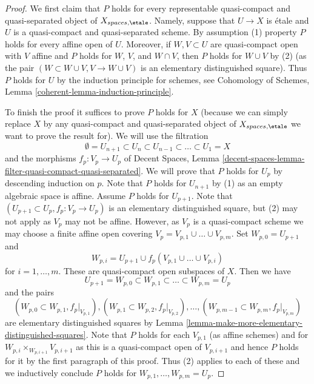 \begin{proof}
We first claim that $P$ holds for every representable
quasi-compact and quasi-separated object of $X_{spaces, \etale}$.
Namely, suppose that $U \to X$ is \'etale and $U$ is a
quasi-compact and quasi-separated scheme. By assumption (1)
property $P$ holds for every affine open of $U$. Moreover, if
$W, V \subset U$ are quasi-compact open with $V$ affine and $P$ holds for 
$W$, $V$, and $W \cap V$, then $P$ holds for $W \cup V$ by (2)
(as the pair $(W \subset W \cup V, V \to W \cup V)$ is an elementary
distinguished square). Thus $P$ holds for $U$ by the induction
principle for schemes, see
Cohomology of Schemes, Lemma \ref{coherent-lemma-induction-principle}.

\medskip\noindent
To finish the proof it suffices to prove $P$ holds for $X$
(because we can simply replace $X$ by any quasi-compact and quasi-separated
object of $X_{spaces, \etale}$ we want to prove the result for).
We will use the filtration
$$
\emptyset = U_{n + 1} \subset
U_n \subset U_{n - 1} \subset \ldots \subset U_1 = X
$$
and the morphisms $f_p : V_p \to U_p$ of
Decent Spaces, Lemma
\ref{decent-spaces-lemma-filter-quasi-compact-quasi-separated}.
We will prove that $P$ holds for $U_p$ by descending induction on $p$.
Note that $P$ holds for $U_{n + 1}$ by (1)
as an empty algebraic space is affine. Assume $P$ holds for $U_{p + 1}$.
Note that $(U_{p + 1} \subset U_p, f_p : V_p \to U_p)$ is an elementary
distinguished square, but (2) may not apply as $V_p$ may not be affine.
However, as $V_p$ is a quasi-compact scheme we may choose a finite affine open
covering $V_p = V_{p, 1} \cup \ldots \cup V_{p, m}$.
Set $W_{p, 0} = U_{p + 1}$ and
$$
W_{p, i} = U_{p + 1} \cup f_p(V_{p, 1} \cup \ldots \cup V_{p, i})
$$
for $i = 1, \ldots, m$. These are quasi-compact open subspaces of $X$.
Then we have
$$
U_{p + 1} = W_{p, 0} \subset
W_{p, 1} \subset \ldots \subset
W_{p, m} = U_p
$$
and the pairs
$$
(W_{p, 0} \subset W_{p, 1}, f_p|_{V_{p, 1}}),
(W_{p, 1} \subset W_{p, 2}, f_p|_{V_{p, 2}}),\ldots,
(W_{p, m - 1} \subset W_{p, m}, f_p|_{V_{p, m}})
$$
are elementary distinguished squares by
Lemma \ref{lemma-make-more-elementary-distinguished-squares}.
Note that $P$ holds for each $V_{p, 1}$ (as affine schemes) and for
$W_{p, i} \times_{W_{p, i + 1}} V_{p, i + 1}$ as this is a quasi-compact
open of $V_{p, i + 1}$ and hence $P$ holds for it by the first paragraph
of this proof. Thus (2) applies to each of these and we inductively
conclude $P$ holds for $W_{p, 1}, \ldots, W_{p, m} = U_p$.
\end{proof}

